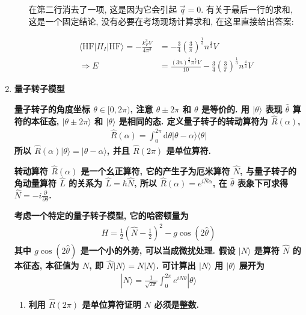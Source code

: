 \documentclass[../../main.tex]{subfiles}
\begin{document}
\begin{enumerate}
\begin{enumerate}
{{    在第二行消去了一项, 这是因为它会引起 $\vec{q} = 0$. 有关于最后一行的求和, 这是一个固定结论, 没有必要在考场现场计算求和, 在这里直接给出答案:

    \begin{align*}
      \langle\text{HF}|H_{I}|\text{HF}\rangle = -\frac{k_{F}^{3}V}{4\pi^{3}} &= -\frac{3}{4}\left(\frac{3}{\pi}\right)^{\frac{1}{3}}n^{\frac{4}{3}}V\\
      \Rightarrow E &= \frac{(3n)^{\frac{5}{3}}\pi^{\frac{4}{3}}V}{10} - \frac{3}{4}\left(\frac{3}{\pi}\right)^{\frac{1}{3}}n^{\frac{4}{3}}V
    \end{align*}}}
  \end{enumerate}

  \item \textbf{量子转子模型}
  
  \textbf{量子转子的角度坐标 $\theta\in[0,2\pi)$, 注意 $\theta\pm 2\pi$ 和 $\theta$ 是等价的. 用 $|\theta\rangle$ 表现 $\hat{\theta}$ 算符的本征态, $|\theta\pm 2\pi\rangle$ 和 $|\theta\rangle$ 是相同的态. 定义量子转子的转动算符为 $\hat{R}(\alpha)$, 
  \begin{align*}
    \hat{R}(\alpha) = \int_{0}^{2\pi}\mathrm{d}\theta |\theta - \alpha\rangle\langle\theta|
  \end{align*}
  所以 $\hat{R}(\alpha)|\theta\rangle = |\theta - \alpha\rangle$, 并且 $\hat{R}(2\pi)$ 是单位算符.}

  \textbf{转动算符 $\hat{R}(\alpha)$ 是一个幺正算符, 它的产生子为厄米算符 $\hat{N}$, 与量子转子的角动量算符 $\hat{L}$ 的关系为 $\hat{L} = \hbar\hat{N}$, 所以 $\hat{R}(\alpha) = e^{i\hat{N}\alpha}$, 在 $\hat{\theta}$ 表象下可求得 $\hat{N} = -i\frac{\partial}{\partial\theta}$. }

  \textbf{考虑一个特定的量子转子模型, 它的哈密顿量为
  \begin{align*}
    H = \frac{1}{2}\left(\hat{N} - \frac{1}{2}\right)^{2} - g\cos{\left(2\hat{\theta}\right)}
  \end{align*}
  其中 $g\cos{\left(2\hat{\theta}\right)}$ 是一个小的外势, 可以当成微扰处理. 假设 $|N\rangle$ 是算符 $\hat{N}$ 的本征态, 本征值为 $N$, 即 $\hat{N}|N\rangle = N|N\rangle$. 可计算出 $|N\rangle$ 用 $|\theta\rangle$ 展开为
  \begin{align*}
    |N\rangle = \frac{1}{\sqrt{2\pi}}\int_{0}^{2\pi}e^{iN\theta}|\theta\rangle
  \end{align*}}
  \begin{enumerate}
    \item \textbf{利用 $\hat{R}(2\pi)$ 是单位算符证明 $N$ 必须是整数.}
    

\end{enumerate}
\end{enumerate}
\end{document}
